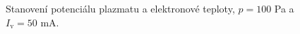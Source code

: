 \documentclass[a4paper,12pt]{article}
\begin{document}
\newpage
\begin{figure}[h]
	\centering
	\begin{subfigure}[b]{.49\textwidth}
		\centering
	\end{subfigure}
	\begin{subfigure}[b]{.49\textwidth}
		\centering
	\end{subfigure}
	\caption{Stanovení potenciálu plazmatu a elektronové teploty, $p = 100$ \si{\pascal} a $I_\text{v} = 50$ \si{\milli\ampere}.}
	\label{data2}
\end{figure}
\end{document}
